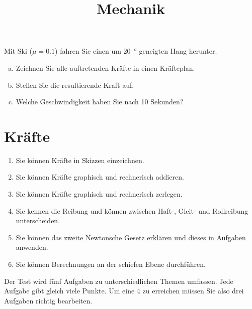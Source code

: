 \documentclass[12pt,a5paper]{article}
\title{Mechanik}
\date{}
\begin{document}
\begin{aufgabe}
	Mit Ski ($\mu=0.1$) fahren Sie einen um \SI{20}{\degree} geneigten Hang herunter.

	\begin{enumerate}[a)]
		\item Zeichnen Sie alle auftretenden Kräfte in einen Kräfteplan.
		\item Stellen Sie die resultierende Kraft auf.
		\item Welche Geschwindigkeit haben Sie nach 10 Sekunden?
	\end{enumerate}
\end{aufgabe}


\section*{Kräfte}

\begin{enumerate}
	\item Sie können Kräfte in Skizzen einzeichnen.
	\item Sie können Kräfte graphisch und rechnerisch addieren.
	\item Sie können Kräfte graphisch und rechnerisch zerlegen.
	\item Sie kennen die Reibung und können zwischen Haft-, Gleit- und Rollreibung unterscheiden.
	\item Sie können das zweite Newtonsche Gesetz erklären und dieses in Aufgaben anwenden.
	\item Sie können Berechnungen an der schiefen Ebene durchführen.

\end{enumerate}

Der Test wird fünf Aufgaben zu unterschiedlichen Themen umfassen. Jede Aufgabe gibt gleich viele Punkte.
Um eine 4 zu erreichen müssen Sie also drei Aufgaben richtig bearbeiten.
\end{document}
